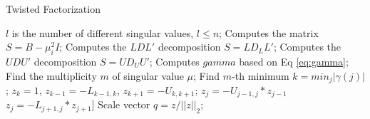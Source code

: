 \begin{algorithm}
\caption{Twisted Factorization}
\label{alg:twisted}
\begin{algorithmic}[1]
  \LineComment $l$ is the number of different singular values, $l\le n$;
    \State Computes the matrix $S = B - \mu_i^2 I$;
    \State Computes the $LDL'$ decomposition $S = LD_LL'$;
    \State Computes the $UDU'$ decomposition $S = UD_UU'$;
    \State Computes $gamma$ based on Eq \ref{eq:gamma};
    \State Find the multiplicity $m$ of singular value $\mu$;
    \State Find $m$-th minimum $k = min_j  |\gamma(j)|$;
    \State $z_k = 1$, $z_{k-1} = -L_{k-1,k}$, $z_{k+1} = -U_{k,k+1}$;
      \State $z_j = -U_{j-1,j}*z_{j-1}$
    \EndFor
      \State $z_j = -L_{j+1,j}*z_{j+1}]$
    \EndFor
    \State Scale vector $q = z/||z||_2$;
    \EndFor
  \EndFor
\EndProcedure
\end{algorithmic}
\end{algorithm}
